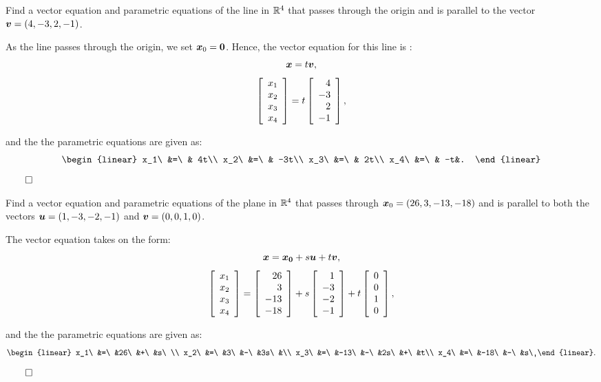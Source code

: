 \begin{Exam} Find a vector equation and parametric equations of the line in $\mathbb{R}^4$ that passes through the origin and is parallel to the vector $\boldsymbol v = (4, -3, 2, -1)$.\\
\begin{multicols}{2}
As the line passes through the origin, we set $\boldsymbol x_0=\boldsymbol 0$. Hence, the vector equation for this line is :
\[\boldsymbol x = t\boldsymbol v,\]
\[\left[\begin{array}{r} x_1\\x_2\\x_3\\x_4 \end{array}\right] = t\left[\begin{array}{r}  4\\-3\\2\\-1 \end{array}\right],\]
\columnbreak 

\mbox{}\vfill
and the the parametric equations are given as:
\[\begin{linear}
x_1\ &=\ & 4t\\
x_2\ &=\ & -3t\\
x_3\ &=\ & 2t\\
x_4\ &=\ & -t&.
\end{linear} \]$\hfill\qedhere$
\end{multicols}
\end{Exam}\vs

\begin{Exam}\label{exam:planeST} %
Find a vector equation and parametric equations of the plane in $\mathbb{R}^4$ that passes through $\boldsymbol x_0 = (26,3,-13,-18)$ and is parallel to both the vectors $\boldsymbol u = (1,-3,-2,-1)$ and $\boldsymbol v =(0,0,1,0) $.
\begin{multicols}{2}
The vector equation takes on the form: \[\boldsymbol x = \boldsymbol{x_0} + s\boldsymbol u + t\boldsymbol v,\]
\[\left[\begin{array}{r} x_1\\x_2\\x_3\\x_4 \end{array}\right] = \left[\begin{array}{r} 26\\3\\-13\\-18 \end{array}\right] + s\left[\begin{array}{r} 1\\-3\\-2\\-1 \end{array}\right]+t\left[\begin{array}{r} 0\\0\\1\\0 \end{array}\right],\]\columnbreak

\mbox{}\vfill
and the the parametric equations are given as:
\[\begin{linear}
x_1\ &=\ &26\ &+\ &s\ \\
x_2\ &=\ &3\  &-\ &3s\ &\\
x_3\ &=\ &-13\ &-\ &2s\ &+\ &t\\
x_4\ &=\ &-18\ &-\ &s\ 
\end{linear}.\]$\hfill\qedhere$
\end{multicols}
\end{Exam}\vs

